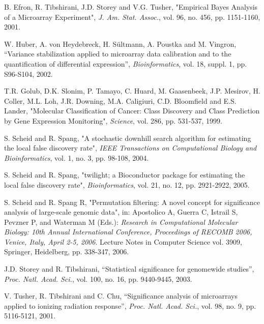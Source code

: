 \documentclass[11pt,a4paper,fleqn]{report}
\begin{document}
\begin{thebibliography}{1}

B. Efron, R. Tibshirani, J.D. Storey and V.G. Tusher, "Empirical Bayes Analysis of a Microarray Experiment", \emph{J. Am. Stat. Assoc.}, vol. 96, no. 456, pp. 1151-1160, 2001.

W. Huber, A. von Heydebreck, H. S{\"u}ltmann, A. Poustka and M. Vingron, ``Variance stabilization applied to microarray data calibration and to the quantification of differential expression'', \emph{Bioinformatics}, vol. 18, suppl. 1, pp. S96-S104, 2002.

T.R. Golub, D.K. Slonim, P. Tamayo, C. Huard, M. Gaasenbeek, J.P. Mesirov, H. Coller, M.L. Loh, J.R. Downing, M.A. Caligiuri, C.D. Bloomfield and E.S. Lander, "Molecular Classification of Cancer: Class Discovery and Class Prediction by Gene Expression Monitoring", \emph{Science}, vol. 286, pp. 531-537, 1999.

S. Scheid and R. Spang, "A stochastic downhill search algorithm for estimating the local false discovery rate", \emph{IEEE Transactions on Computational Biology and Bioinformatics}, vol. 1, no. 3, pp. 98-108, 2004.

S. Scheid and R. Spang, "twilight; a Bioconductor package for estimating the local false discovery rate", \emph{Bioinformatics}, vol. 21, no. 12, pp. 2921-2922, 2005.
       
S. Scheid and R. Spang R, "Permutation filtering: A novel concept for significance analysis of large-scale genomic data", in: Apostolico A, Guerra C, Istrail S, Pevzner P, and Waterman M (Eds.): \emph{Research in Computational Molecular Biology: 10th Annual International Conference, Proceedings of RECOMB 2006, Venice, Italy, April 2-5, 2006}. Lecture Notes in Computer Science vol. 3909, Springer, Heidelberg, pp. 338-347, 2006.

J.D. Storey and R. Tibshirani, ``Statistical significance for genomewide studies'', \textit{Proc. Natl. Acad. Sci.}, vol. 100, no. 16, pp. 9440-9445, 2003.

V. Tusher, R. Tibshirani and C. Chu, ``Significance analysis of microarrays applied to ionizing radiation response'', \textit{Proc. Natl. Acad. Sci.}, vol. 98, no. 9, pp. 5116-5121, 2001.

\end{thebibliography}
\end{document}
